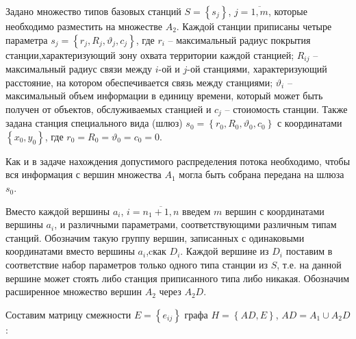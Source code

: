 





Задано множество типов базовых станций $S = \left\{s_j\right\}$, $j=\overline{1,m}$, которые необходимо разместить на множестве $A_2$. Каждой станции приписаны четыре параметра $s_j = \left\{r_j, R_j, \vartheta_j, c_j \right\}$, где $r_i$ -- максимальный радиус покрытия станции,характеризующий зону охвата территории каждой станцией; $R_{ij}$ -- максимальный радиус связи между $i$-ой и $j$-ой станциями, характеризующий расстояние, на котором обеспечивается связь между станциями; $\vartheta_i$ -- максимальный объем информации в единицу времени, который может быть получен от объектов, обслуживаемых станцией и $c_j$ -- стоиомость станции. Также задана станция специального вида (шлюз) $s_0 = \left\{ r_0, R_0, \vartheta_0, c_0 \right\}$ с координатами $\left\{x_0, y_0 \right\}$, где $r_0 = R_0 = \vartheta_0 = c_0 = 0$.

Как и в задаче нахождения допустимого распределения потока необходимо, чтобы вся информация с вершин множества $A_1$ могла быть собрана  передана на шлюза $s_0$.

Вместо каждой вершины $a_i$, $i= \overline{n_1+1,n}$ введем $m$ вершин с координатами вершины $a_i$, и различными параметрами, соответствующими различным типам станций. Обозначим такую группу вершин, записанных с одинаковыми координатами вместо вершины $a_i$,cкак $D_i$. Каждой вершине из $D_i$ поставим в соответствие набор параметров только одного типа станции из $S$, т.е. на данной вершине может стоять либо станция приписанного типа либо никакая. Обозначим расширенное множество вершин $A_2$ через $A_2D$.

Составим матрицу смежности $E = \left\{e_{ij}\right\}$ графа $H=\left\{AD,E\right\}$, $AD=A_1 \cup A_2D$:

